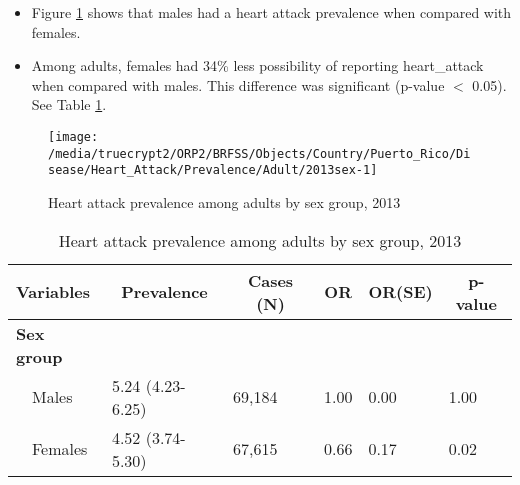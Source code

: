 \newpage
\begin{itemize}

\item Figure \ref{fig:sex.Heart_Attack.2013} shows that males had a 
heart attack prevalence when compared with females.


\item Among adults, females had 34\% less possibility of reporting heart_attack when compared with males. This difference was significant (p-value $<$ 0.05). See Table \ref{tab:sex.Heart_Attack.2013}.

\end{itemize}

\begin{figure}[H]
\caption{Heart attack prevalence among adults by sex group, 
2013}
\begin{knitrout}
\color{fgcolor}

{\centering \texttt{[image: /media/truecrypt2/ORP2/BRFSS/Objects/Country/Puerto\_Rico/Disease/Heart\_Attack/Prevalence/Adult/2013sex-1]} 

}



\end{knitrout}
\label{fig:sex.Heart_Attack.2013}
\end{figure}

\begin{table}[H]
\caption{Heart attack prevalence  among adults by sex group, 2013\label{tab:sex.Heart_Attack.2013}} 
\begin{center}
\begin{tabular}{llllll}
\hline\hline
\multicolumn{1}{l}{Variables}&\multicolumn{1}{c}{Prevalence}&\multicolumn{1}{c}{Cases (N)}&\multicolumn{1}{c}{OR}&\multicolumn{1}{c}{OR(SE)}&\multicolumn{1}{c}{p-value}\tabularnewline
\hline
{\bfseries Sex group}&&&&&\tabularnewline
~~Males&5.24 (4.23-6.25)&69,184&1.00&0.00&1.00\tabularnewline
~~Females&4.52 (3.74-5.30)&67,615&0.66&0.17&0.02\tabularnewline
\hline
\end{tabular}\end{center}

\end{table}


